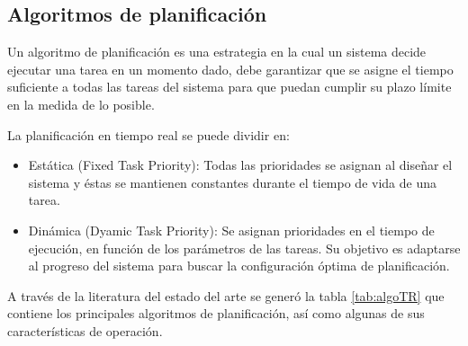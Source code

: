     \subsection{Algoritmos de planificación}\label{sec:AlgoPlan} 
    
    Un algoritmo de planificación es una estrategia en la cual un sistema decide ejecutar una tarea en un momento dado, debe garantizar que se asigne el tiempo suficiente a todas las tareas del sistema para que puedan cumplir su plazo límite en la medida de lo posible.
    
    La planificación en tiempo real se puede dividir en:
    \begin{itemize}
    \item Estática (Fixed Task Priority):  Todas las prioridades se asignan al diseñar el sistema y éstas se mantienen constantes durante el tiempo de vida de una tarea.
    \item Dinámica (Dyamic Task Priority): Se asignan prioridades en el tiempo de ejecución, en función de los parámetros de las tareas. Su objetivo es adaptarse al progreso del sistema para buscar la configuración óptima de planificación.
    \end{itemize}   
    
    A través de la literatura del estado del arte se generó la tabla \ref{tab:algoTR} que contiene los principales algoritmos de planificación, así como algunas de sus características de operación.
    

